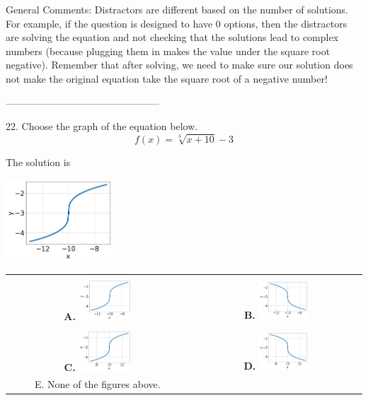 \documentclass{extbook}[14pt]
\begin{document}
General Comments: Distractors are different based on the number of solutions. For example, if the question is designed to have 0 options, then the distractors are solving the equation and not checking that the solutions lead to complex numbers (because plugging them in makes the value under the square root negative). Remember that after solving, we need to make sure our solution does not make the original equation take the square root of a negative number!

-----------------------------------------------

22. Choose the graph of the equation below.
\[ f(x) = \sqrt[3]{x + 10} - 3 \] 

 
 The solution is  
 \begin{center} \includegraphics[width=0.3\textwidth]{../Figures/radicalEquationToGraphCC.png} \end{center}\begin{tabular}{|c|c|} 
\hline 
 & \tabularnewline 
 \textbf{A.} \includegraphics[width=0.3\textwidth]{../Figures/radicalEquationToGraphCC.png} & \textbf{B.} \includegraphics[width=0.3\textwidth]{../Figures/radicalEquationToGraphAC.png} \tabularnewline 
\hline 
 & \tabularnewline 
 \textbf{C.} \includegraphics[width=0.3\textwidth]{../Figures/radicalEquationToGraphDC.png} & \textbf{D.} \includegraphics[width=0.3\textwidth]{../Figures/radicalEquationToGraphBC.png} \tabularnewline 
\hline 
 E. None of the figures above. & \tabularnewline 
\hline 
 \end{tabular} 
 
\end{document}
